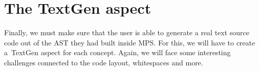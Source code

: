 \section{The TextGen aspect}
Finally, we must make sure that the user is able to generate a real text source code out of the AST they had built inside MPS.
For this, we will have to create a~TextGen aspect for each concept.
Again, we will face some interesting challenges connected to the code layout, whitespaces and more.
